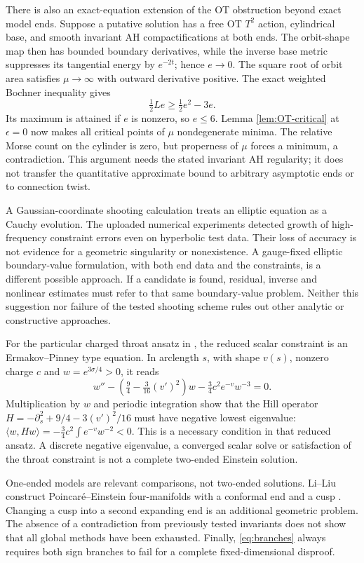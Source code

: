 \documentclass[a4paper,11pt]{article}
\numberwithin{equation}{section}
\theoremstyle{definition}
\begin{document}
There is also an exact-equation extension of the OT obstruction beyond exact model ends. Suppose a putative solution has a free OT $T^2$ action, cylindrical base, and smooth invariant AH compactifications at both ends. The orbit-shape map then has bounded boundary derivatives, while the inverse base metric suppresses its tangential energy by $e^{-2t}$; hence $e\to0$. The square root of orbit area satisfies $\mu\to\infty$ with outward derivative positive. The exact weighted Bochner inequality gives
\[
 \tfrac12Le\ge\tfrac12e^2-3e.
\]
Its maximum is attained if $e$ is nonzero, so $e\le6$. Lemma \ref{lem:OT-critical} at $\epsilon=0$ now makes all critical points of $\mu$ nondegenerate minima. The relative Morse count on the cylinder is zero, but properness of $\mu$ forces a minimum, a contradiction. This argument needs the stated invariant AH regularity; it does not transfer the quantitative approximate bound to arbitrary asymptotic ends or to connection twist.

A Gaussian-coordinate shooting calculation treats an elliptic equation as a Cauchy evolution. The uploaded numerical experiments detected growth of high-frequency constraint errors even on hyperbolic test data. Their loss of accuracy is not evidence for a geometric singularity or nonexistence. A gauge-fixed elliptic boundary-value formulation, with both end data and the constraints, is a different possible approach. If a candidate is found, residual, inverse and nonlinear estimates must refer to that same boundary-value problem. Neither this suggestion nor failure of the tested shooting scheme rules out other analytic or constructive approaches.

For the particular charged throat ansatz in , the reduced scalar constraint is an Ermakov--Pinney type equation. In arclength $s$, with shape $v(s)$, nonzero charge $c$ and $w=e^{3\sigma/4}>0$, it reads
\[
 w''-\left(\tfrac94-\tfrac3{16}(v')^2\right)w
       -\tfrac34c^2e^{-v}w^{-3}=0.
\]
Multiplication by $w$ and periodic integration show that the Hill operator
$H=-\partial_s^2+9/4-3(v')^2/16$ must have negative lowest eigenvalue:
$\langle w,Hw\rangle=-\tfrac34c^2\int e^{-v}w^{-2}<0$.
This is a necessary condition in that reduced ansatz. A discrete negative eigenvalue, a converged scalar solve or satisfaction of the throat constraint is not a complete two-ended Einstein solution.

One-ended models are relevant comparisons, not two-ended solutions. Li--Liu construct Poincar\'e--Einstein four-manifolds with a conformal end and a cusp \cite{LiLiuCusps}. Changing a cusp into a second expanding end is an additional geometric problem. The absence of a contradiction from previously tested invariants does not show that all global methods have been exhausted. Finally, \eqref{eq:branches} always requires both sign branches to fail for a complete fixed-dimensional disproof.
\end{document}
